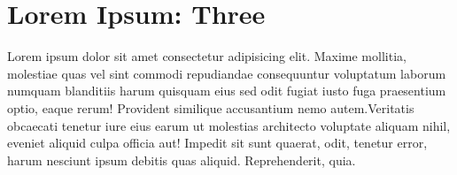 \section{Lorem Ipsum: Three} \label{chap-3}
Lorem ipsum dolor sit amet consectetur adipisicing elit. Maxime mollitia,
molestiae quas vel sint commodi repudiandae consequuntur voluptatum laborum
numquam blanditiis harum quisquam eius sed odit fugiat iusto fuga praesentium
optio, eaque rerum! Provident similique accusantium nemo autem.Veritatis
obcaecati tenetur iure eius earum ut molestias architecto voluptate aliquam
nihil, eveniet aliquid culpa officia aut! Impedit sit sunt quaerat, odit,
tenetur error, harum nesciunt ipsum debitis quas aliquid. Reprehenderit,
quia.